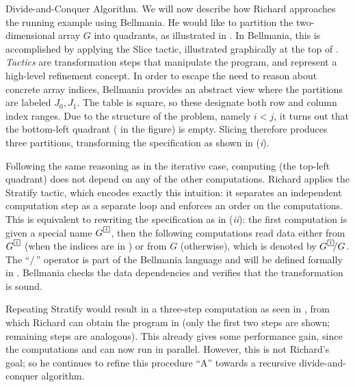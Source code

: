 \begin{paragraph}{Divide-and-Conquer Algorithm.}
We will now describe how Richard approaches the running example using Bellmania.
He would like to partition the two-di\-men\-sio\-nal array $G$ into
quadrants, as illustrated in .
In Bellmania, this is accomplished by applying the {\sf Slice} tactic,
illustrated graphically at the top of .
{\em Tactics} are transformation steps that manipulate the program,
and represent a high-level refinement concept.
In order to escape the need to reason about concrete array indices,
Bellmania provides an abstract view where
the partitions are labeled $J_0,J_1$. The table is square, so these
designate both row and column index ranges.
Due to the structure of the problem, namely $i\!<\!j$, it turns out that
the bottom-left quadrant ( in the figure) is empty.
Slicing therefore produces three partitions, transforming the specification
as shown in ({\it i}).

Following the same reasoning as in the iterative case, computing 
(the top-left quadrant)
does not depend on any of the other computations. Richard applies the
{\sf Stratify} tactic, which encodes exactly this intuition: it separates
an independent computation step as a separate loop and enforces an order
on the computations.
This is equivalent to rewriting the specification as in ({\it ii}):
the first computation is given a special name $G^{\tinyqbox1}$, then the following
computations read data either from $G^{\tinyqbox1}$ (when the indices are in )
or from $G$ (otherwise), which is denoted by $G^{\tinyqbox1}\!/G$. The ``$/\,$'' operator
is part of the Bellmania language and will be defined formally in .
Bellmania checks the data dependencies and verifies that the transformation
is sound.

Repeating {\sf Stratify} would result in a three-step computation
as seen in , from which Richard can obtain the program in 
(only the first two steps are shown; remaining steps are analogous).
This already gives some performance gain, since the computations  and 
can now run in parallel. However, this is not Richard's goal;
so he continues to refine this procedure ``A'' towards
a recursive divide-and-conquer algorithm.
\end{paragraph}


